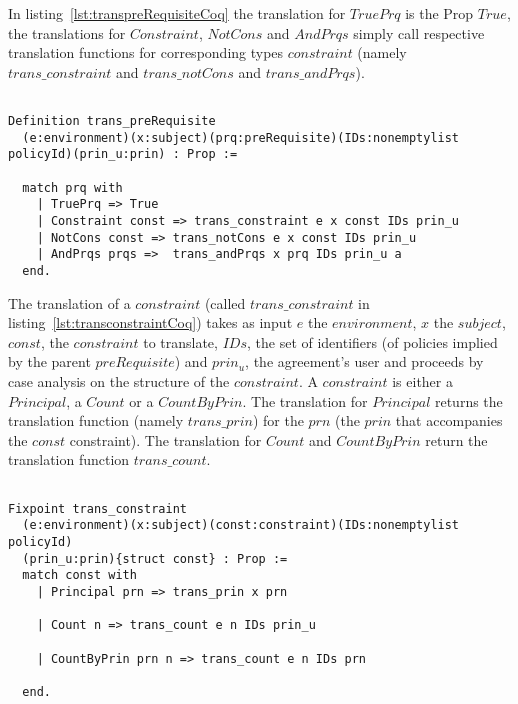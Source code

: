 In listing~\ref{lst:transpreRequisiteCoq} the translation for $TruePrq$ is the Prop $True$, the translations for $Constraint$, $NotCons$ and $AndPrqs$ simply call respective translation functions for corresponding types $constraint$ (namely $trans\_constraint$ and $trans\_notCons$ and $trans\_andPrqs$). 


\begin{minipage}[c]{0.95\textwidth}
\begin{lstlisting}

Definition trans_preRequisite
  (e:environment)(x:subject)(prq:preRequisite)(IDs:nonemptylist policyId)(prin_u:prin) : Prop := 

  match prq with
    | TruePrq => True
    | Constraint const => trans_constraint e x const IDs prin_u  
    | NotCons const => trans_notCons e x const IDs prin_u 
    | AndPrqs prqs =>  trans_andPrqs x prq IDs prin_u a
  end.
\end{lstlisting}
\end{minipage}

The translation of a $constraint$ (called $trans\_constraint$ in listing~\ref{lst:transconstraintCoq}) takes as input $e$ the $environment$, $x$ the $subject$, $const$, the $constraint$ to translate, $IDs$, the set of identifiers (of policies implied by the parent $preRequisite$) and $prin_{u}$, the agreement's user and proceeds by case analysis on the structure of the $constraint$. A $constraint$ is either a $Principal$, a $Count$ or a $CountByPrin$. The translation for $Principal$ returns the translation function (namely $trans\_prin$) for the $prn$ (the $prin$ that accompanies the $const$ constraint). The translation for $Count$ and $CountByPrin$ return the translation function $trans\_count$. 


\begin{lstlisting}

Fixpoint trans_constraint 
  (e:environment)(x:subject)(const:constraint)(IDs:nonemptylist policyId)
  (prin_u:prin){struct const} : Prop := 
  match const with
    | Principal prn => trans_prin x prn
  
    | Count n => trans_count e n IDs prin_u

    | CountByPrin prn n => trans_count e n IDs prn 

  end.
  
\end{lstlisting}


